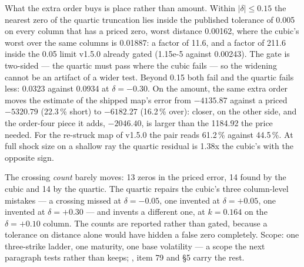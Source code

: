 \documentclass[11pt,a4paper]{article}
\begin{document}
What the extra order buys is place rather than amount. Within $|\delta| \le 0.15$ the nearest zero of
the quartic truncation lies inside the published tolerance of 0.005 on every column that has a priced
zero, worst distance 0.00162, where the cubic's worst over the same columns is 0.01887: a factor of
11.6, and a factor of 211.6 inside the 0.05 limit v1.5.0 already gated (1.15e-5 against 0.00243). The
gate is two-sided --- the quartic must pass where the cubic fails --- so the widening cannot be an
artifact of a wider test. Beyond 0.15 both fail and the quartic fails less: 0.0323 against 0.0934 at
$\delta = -0.30$. On the amount, the same extra order moves the  estimate of
the shipped map's error from $-4135.87$ against a priced $-5320.79$ (22.3\,\% short) to $-6182.27$
(16.2\,\% over): closer, on the other side, and the order-four piece it adds, $-2046.40$, is larger
than the 1184.92 the price needed. For the re-struck map of v1.5.0 the pair reads 61.2\,\% against
44.5\,\%. At full shock size on a shallow ray the quartic residual is 1.38x
the cubic's with the opposite sign.

The crossing \emph{count} barely moves: 13 zeros in the priced error, 14 found by the cubic and 14 by
the quartic. The quartic repairs the cubic's three column-level mistakes --- a crossing missed at
$\delta = -0.05$, one invented at $\delta = +0.05$, one invented at $\delta = +0.30$ --- and invents a
different one, at $k = 0.164$ on the $\delta = +0.10$ column. The counts are reported rather than
gated, because a tolerance on distance alone would have hidden a false zero completely. Scope: one
three-strike ladder, one maturity, one base volatility --- a scope the next paragraph tests rather than
keeps; , item 79 and
 §5 carry the rest.
\end{document}
